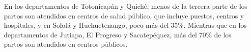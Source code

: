 En los departamentos de Totonicapán y Quiché, menos de la tercera parte de los partos son atendidos en centros de salud público, que incluye puestos, centros y hospitales, y en Sololá y Huehuetenango, poco más del 35\%. Mientras que en los departamentos de Jutiapa, El Progreso y Sacatepéquez, más del 70\% de los partos son atendidos en centros públicos.  